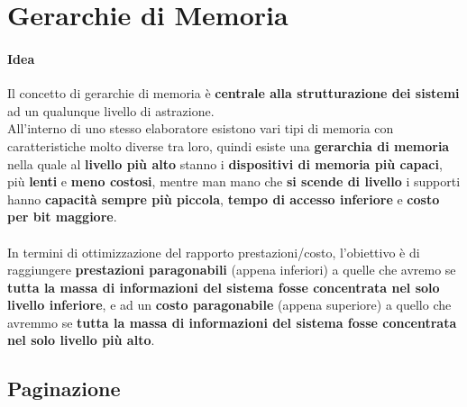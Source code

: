 \documentclass[10pt]{report}
\begin{document}
\section{Gerarchie di Memoria}
\paragraph{Idea} Il concetto di gerarchie di memoria è \textbf{centrale alla strutturazione dei sistemi} ad un qualunque livello di astrazione.\\
All'interno di uno stesso elaboratore esistono vari tipi di memoria con caratteristiche molto diverse tra loro, quindi esiste una \textbf{gerarchia di memoria} nella quale al \textbf{livello più alto} stanno i \textbf{dispositivi di memoria più capaci}, più \textbf{lenti} e \textbf{meno costosi}, mentre man mano che \textbf{si scende di livello} i supporti hanno \textbf{capacità sempre più piccola}, \textbf{tempo di accesso inferiore} e \textbf{costo per bit maggiore}.\\\\
In termini di ottimizzazione del rapporto prestazioni/costo, l'obiettivo è di raggiungere \textbf{prestazioni paragonabili} (appena inferiori) a quelle che avremo se \textbf{tutta la massa di informazioni del sistema fosse concentrata nel solo livello inferiore}, e ad un \textbf{costo paragonabile} (appena superiore) a quello che avremmo se \textbf{tutta la massa di informazioni del sistema fosse concentrata nel solo livello più alto}.
\pagebreak
\subsection{Paginazione}
\end{document}
